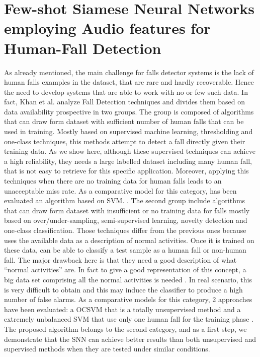 \section{Few-shot Siamese Neural Networks employing Audio features for Human-Fall Detection}
\label{sec:siamese_few_shot}
As already mentioned, the main challenge for falls detector systems is the lack of human falls examples in the dataset, that are rare and hardly recoverable. Hence the need to develop systems that are able to work with no or few such data. In fact, Khan et al. \cite{khan2017review} analyze Fall Detection techniques and divides them based on data availability prospective in two groups. The group is composed of algorithms that can draw form dataset with sufficient number of human falls that can be used in training. Mostly based on supervised machine learning, thresholding and one-class techniques, this methods attempt to detect a fall directly given their training data. As we show here, although these supervised techniques can achieve a high reliability, they needs a large labelled dataset including many human fall, that is not easy to retrieve for this specific application. Moreover, applying this techniques when there are no training data for human falls leads to an unacceptable miss rate. As a comparative model for this category, has been evaluated an algorithm based on SVM.%
. The second group include algorithms that can draw form dataset with insufficient or no training data for falls mostly based on over/under-sampling, semi-supervised learning, novelty detection and one-class classification. Those techniques differ from the previous ones because uses the available data as a description of normal activities. Once it is trained on these data, can be able to classify a test sample as a human fall or non-human fall. The major drawback here is that they need a good description of what ``normal activities'' are. In fact to give a good representation of this concept, a big data set comprising all the normal activities is needed \cite{pimentel2014review}. In real scenario, this is very difficult to obtain and this may induce the classifier to produce a high number of false alarms. As a comparative models for this category, 2 approaches have been evaluated: a OCSVM that is a totally unsupervised method and a extremely unbalanced SVM that use only one human fall for the training phase%
.
The proposed algorithm belongs to the second category, and as a first step, we demonstrate that the SNN can achieve better results than both unsupervised and supervised methods when they are tested under similar conditions.


